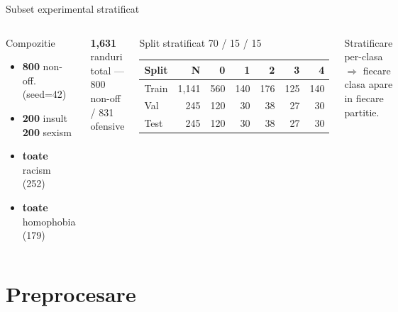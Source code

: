 \documentclass[10pt,aspectratio=169]{beamer}
\newcommand{\bignum}[1]{{\fontsize{34}{40}\selectfont\textbf{\textcolor{ubaccent}{#1}}}}
\newcommand{\sub}[1]{{\small\textcolor{ubdark!70}{#1}}}
\begin{document}
\begin{frame}{Subset experimental stratificat}
\vspace{0.3em}
\begin{columns}[T,onlytextwidth]
\begin{block}{Compozitie}
\small
\begin{itemize}\setlength\itemsep{0.25em}
  \item \textbf{800} non-off. \sub{(seed=42)}
  \item \textbf{200} insult \quad \textbf{200} sexism
  \item \textbf{toate} racism \sub{(252)}
  \item \textbf{toate} homophobia \sub{(179)}
\end{itemize}
\end{block}
\vspace{0.4em}
\begin{center}
\bignum{1{,}631}\\[-0.2em]
\sub{randuri total --- 800 non-off / 831 ofensive}
\end{center}

\begin{block}{Split stratificat 70 / 15 / 15}
\centering
\renewcommand{\arraystretch}{1.25}
\footnotesize
\begin{tabular}{lrrrrrr}
\toprule
\textbf{Split} & \textbf{N} & 0 & 1 & 2 & 3 & 4 \\
\midrule
Train & 1{,}141 & 560 & 140 & 176 & 125 & 140 \\
Val   &   245   & 120 &  30 &  38 &  27 &  30 \\
Test  &   245   & 120 &  30 &  38 &  27 &  30 \\
\bottomrule
\end{tabular}
\end{block}
\vspace{0.3em}
\begin{center}\sub{Stratificare per-clasa $\Rightarrow$ fiecare clasa apare in fiecare partitie.}\end{center}
\end{columns}
\end{frame}

\section{Preprocesare}
\end{document}
